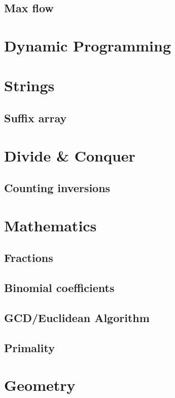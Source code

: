 \documentclass[10pt]{article}
\begin{document}
\subsection{Max flow}

\section{Dynamic Programming}

\section{Strings}

\subsection{Suffix array}

\section{Divide \& Conquer}

\subsection{Counting inversions}

\section{Mathematics}

\subsection{Fractions}

\subsection{Binomial coefficients}

\subsection{GCD/Euclidean Algorithm}

\subsection{Primality}

\section{Geometry}
\end{document}
